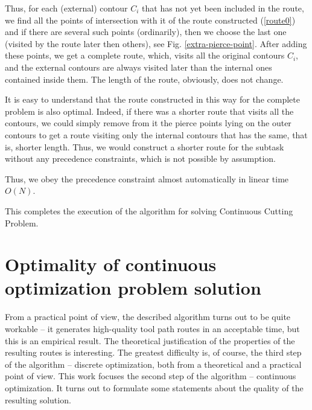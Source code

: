 \documentclass[]{llncs}
\begin{document}
Thus,
for each (external) contour
$C_i$
that has not yet been included in the route,
we find all the points of intersection
with it of the route constructed
(\ref{route0})
and if there are several such points (ordinarily),
then we choose the last one
(visited by the route later then others),
see Fig. \ref{extra-pierce-point}.
After adding these points,
we get a complete route,
which,
visits all the original contours
$C_i$,
and the external contours are always visited later than
the internal ones contained inside them.
The length of the route, obviously, does not change.

It is easy to understand
that the route constructed in this way
for the complete problem
is also optimal.
Indeed,
if there was a shorter route
that visits all the contours,
we could simply remove from it
the pierce points
lying on the outer contours to get a route
visiting only the internal contours
that has the same, that is, shorter length.
Thus, we would construct a shorter route
for the subtask without any precedence constraints,
which is not possible by assumption.

Thus,
we obey the precedence constraint
almost automatically in linear time
$O(N)$.

This completes the execution of the algorithm
for solving Continuous Cutting Problem.

\section{Optimality of continuous optimization problem solution}
\label{sec:math}

From a practical point of view,
the described algorithm turns out to be quite workable --
it generates high-quality tool path routes in an acceptable time,
but this is an empirical result.
The theoretical justification of the properties
of the resulting routes is interesting.
The greatest difficulty is, of course,
the third step of the algorithm --
discrete optimization,
both from a theoretical and a
practical point of view.
This work focuses the second step of the algorithm --
continuous optimization.
It turns out to formulate some statements
about the quality of the resulting solution.
\end{document}
